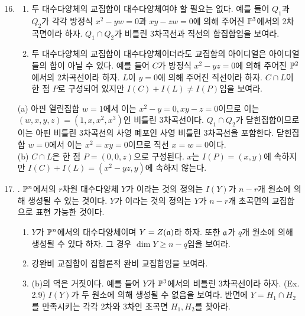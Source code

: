 		\begin{enumerate}[label=\tb{2.\arabic*.},itemindent=0mm,itemsep=4mm]
		\setcounter{enumi}{15}
		\item \begin{enumerate}[label=(\alph*)]
			\item 두 대수다양체의 교집합이 대수다양체여야 할 필요는 없다.
			예를 들어 $Q_1$과 $Q_2$가 각각 방정식 $x^2-yw=0$과 $xy-zw=0$에 의해 주어진 $\mathbb{P}^3$에서의 2차곡면이라 하자.
			$Q_1\cap Q_2$가 비틀린 3차곡선과 직선의 합집합임을 보여라.
			\item 두 대수다양체의 교집합이 대수다양체이더라도 교집합의 아이디얼은 아이디얼들의 합이 아닐 수 있다.
			예를 들어 $C$가 방정식 $x^2-yz=0$에 의해 주어진 $\mathbb{P}^2$에서의 2차곡선이라 하자.
			$L$이 $y=0$에 의해 주어진 직선이라 하자. $C\cap L$이 한 점 $P$로 구성되어 있지만 $I(C)+I(L)\ne I(P)$임을 보여라.
		\end{enumerate}
		\sol (a) 아핀 열린집합 $w=1$에서 이는 $x^2-y=0,xy-z=0$이므로 이는 $(w,x,y,z)=(1,x,x^2,x^3)$인 비틀린 3차곡선이다.
		$Q_1\cap Q_2$가 닫힌집합이므로 이는 아핀 비틀린 3차곡선의 사영 폐포인 사영 비틀린 3차곡선을 포함한다.
		닫힌집합 $w=0$에서 이는 $x^2=xy=0$이므로 직선 $x=w=0$이다.\\
		(b) $C\cap L$은 한 점 $P=(0,0,z)$으로 구성된다. $x$는 $I(P)=(x,y)$에 속하지만 $I(C)+I(L)=(x^2-yz,y)$에 속하지 않는다.
		\item {}. $\mathbb{P}^n$에서의 $r$차원 대수다양체 $Y$가 이라는
		것의 정의는 $I(Y)$가 $n-r$개 원소에 의해 생성될 수 있는 것이다.
		$Y$가 이라는 것의 정의는
		$Y$가 $n-r$개 초곡면의 교집합으로 표현 가능한 것이다.
		\begin{enumerate}[label=(\alph*)]
			\item $Y$가 $\mathbb{P}^n$에서의 대수다양체이며 $Y=Z(\mathfrak{a})$라 하자. 또한 $\mathfrak{a}$가 $q$개 원소에 의해 생성될 수 있다 하자.
			그 경우 $\dim Y\ge n-q$임을 보여라.
			\item 강완비 교집합이 집합론적 완비 교집합임을 보여라.
		\end{enumerate}
		\begin{enumerate}[label=*(\alph*)]
			\setcounter{enumii}{2}
			\item (b)의 역은 거짓이다. 예를 들어 $Y$가 $\mathbb{P}^3$에서의 비틀린 3차곡선이라 하자. (Ex. 2.9)
			$I(Y)$가 두 원소에 의해 생성될 수 없음을 보여라.
			반면에 $Y=H_1\cap H_2$를 만족시키는 각각 2차와 3차인 초곡면 $H_1,H_2$를 찾아라.
		\end{enumerate}

\end{enumerate}
